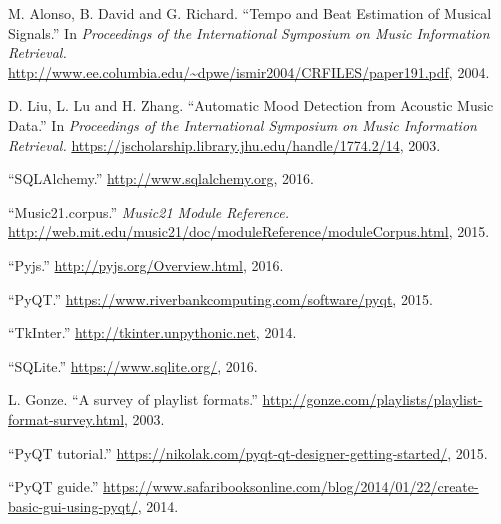 \documentclass{article}
\begin{document}
\begin{thebibliography}{cites}
M. Alonso, B. David and G. Richard. ``Tempo and Beat Estimation of Musical Signals.'' In {\it Proceedings of the International Symposium on Music Information Retrieval.} \url{http://www.ee.columbia.edu/~dpwe/ismir2004/CRFILES/paper191.pdf}, 2004.

D. Liu, L. Lu and H. Zhang. ``Automatic Mood Detection from Acoustic Music Data.'' In {\it Proceedings of the International Symposium on Music Information Retrieval.} \url{https://jscholarship.library.jhu.edu/handle/1774.2/14}, 2003.

``SQLAlchemy.'' \url{http://www.sqlalchemy.org}, 2016.

``Music21.corpus.'' {\it Music21 Module Reference.} \url{http://web.mit.edu/music21/doc/moduleReference/moduleCorpus.html}, 2015.

``Pyjs.'' \url{http://pyjs.org/Overview.html}, 2016.

``PyQT.'' \url{https://www.riverbankcomputing.com/software/pyqt}, 2015.

``TkInter.'' \url{http://tkinter.unpythonic.net}, 2014.

``SQLite.'' \url{https://www.sqlite.org/}, 2016.

L. Gonze. ``A survey of playlist formats.'' \url{http://gonze.com/playlists/playlist-format-survey.html}, 2003.

``PyQT tutorial.'' \url{https://nikolak.com/pyqt-qt-designer-getting-started/}, 2015.

``PyQT guide.'' \url{https://www.safaribooksonline.com/blog/2014/01/22/create-basic-gui-using-pyqt/}, 2014.

\end{thebibliography}
\end{document}
